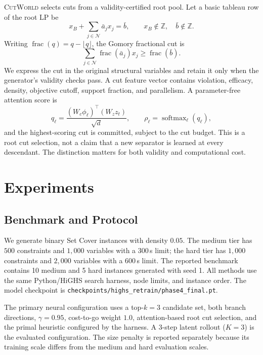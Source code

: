 \documentclass{article}
\newcommand{\CutWorld}{\textsc{CutWorld}}
\newcommand{\softmax}{\operatorname{softmax}}
\begin{document}
\CutWorld{} selects cuts from a validity-certified root pool. Let a basic tableau row of the root LP be
\begin{equation}
  x_B+\sum_{j\in\mathcal{N}} \bar a_j x_j=\bar b,
  \qquad x_B\notin\mathbb{Z},\quad \bar b\notin\mathbb{Z}.
  \label{eq:tableau}
\end{equation}
Writing $\operatorname{frac}(q)=q-\lfloor q\rfloor$, the Gomory fractional
cut is
\begin{equation}
  \sum_{j\in\mathcal{N}}
      \operatorname{frac}(\bar a_j)x_j
  \ge
      \operatorname{frac}(\bar b).
  \label{eq:gomory}
\end{equation}
We express the cut in the original structural variables and retain it only when the generator's validity checks pass. A cut feature vector contains violation, efficacy, density, objective cutoff, support fraction, and parallelism. A parameter-free attention score is
\begin{equation}
  q_\ell=\frac{(W_c\phi_\ell)^\top(W_z z_t)}{\sqrt d},
  \qquad
  \rho_\ell=\softmax_\ell(q_\ell),
  \label{eq:cut-score}
\end{equation}
and the highest-scoring cut is committed, subject to the cut budget. This is a root cut selection, not a claim that a new separator is learned at every descendant. The distinction matters for both validity and computational cost.



\section{Experiments}
\label{sec:experiments}

\subsection{Benchmark and Protocol}

We generate binary Set Cover instances with density $0.05$. The medium tier has $500$ constraints and $1{,}000$ variables with a 300\,s limit; the hard tier has $1{,}000$ constraints and $2{,}000$ variables with a 600\,s limit. The reported benchmark contains 10 medium and 5 hard instances generated with seed 1. All methods use the same Python/HiGHS search harness, node limits, and instance order. The model checkpoint is \texttt{checkpoints/highs\_retrain/phase4\_final.pt}.

The primary neural configuration uses a top-$k=3$ candidate set, both branch directions, $\gamma=0.95$, cost-to-go weight $1.0$, attention-based root cut selection, and the primal heuristic configured by the harness. A 3-step latent rollout ($K=3$) is the evaluated configuration. The size penalty is reported separately because its training scale differs from the medium and hard evaluation scales.
\end{document}
